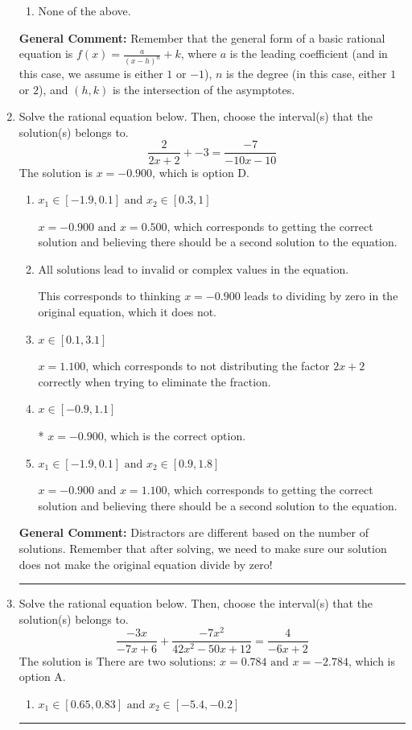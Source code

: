 \documentclass{extbook}[14pt]
\newcommand{\litem}[1]{\item #1

\rule{\textwidth}{0.4pt}}
\begin{document}
\begin{enumerate}
{\begin{enumerate}[label=\Alph*.]
\begin{multicols}{2}
\end{multicols}\item None of the above.\end{enumerate}
\textbf{General Comment:} Remember that the general form of a basic rational equation is $ f(x) = \frac{a}{(x-h)^n} + k$, where $a$ is the leading coefficient (and in this case, we assume is either $1$ or $-1$), $n$ is the degree (in this case, either $1$ or $2$), and $(h, k)$ is the intersection of the asymptotes.
}
\litem{
Solve the rational equation below. Then, choose the interval(s) that the solution(s) belongs to.
\[ \frac{2}{2x + 2} + -3 = \frac{-7}{-10x -10} \]The solution is \( x = -0.900 \), which is option D.\begin{enumerate}[label=\Alph*.]
\item \( x_1 \in [-1.9, 0.1] \text{ and } x_2 \in [0.3,1] \)

$x = -0.900 \text{ and } x = 0.500$, which corresponds to getting the correct solution and believing there should be a second solution to the equation.
\item \( \text{All solutions lead to invalid or complex values in the equation.} \)

This corresponds to thinking $x = -0.900$ leads to dividing by zero in the original equation, which it does not.
\item \( x \in [0.1,3.1] \)

$x = 1.100$, which corresponds to not distributing the factor $2x + 2$ correctly when trying to eliminate the fraction.
\item \( x \in [-0.9,1.1] \)

* $x = -0.900$, which is the correct option.
\item \( x_1 \in [-1.9, 0.1] \text{ and } x_2 \in [0.9,1.8] \)

$x = -0.900 \text{ and } x = 1.100$, which corresponds to getting the correct solution and believing there should be a second solution to the equation.
\end{enumerate}

\textbf{General Comment:} Distractors are different based on the number of solutions. Remember that after solving, we need to make sure our solution does not make the original equation divide by zero!
}
\litem{
Solve the rational equation below. Then, choose the interval(s) that the solution(s) belongs to.
\[ \frac{-3x}{-7x + 6} + \frac{-7x^{2}}{42x^{2} -50 x + 12} = \frac{4}{-6x + 2} \]The solution is \( \text{There are two solutions: } x = 0.784 \text{ and } x = -2.784 \), which is option A.\begin{enumerate}[label=\Alph*.]
\item \( x_1 \in [0.65, 0.83] \text{ and } x_2 \in [-5.4,-0.2] \)


\end{enumerate}}
\end{enumerate}
\end{document}
